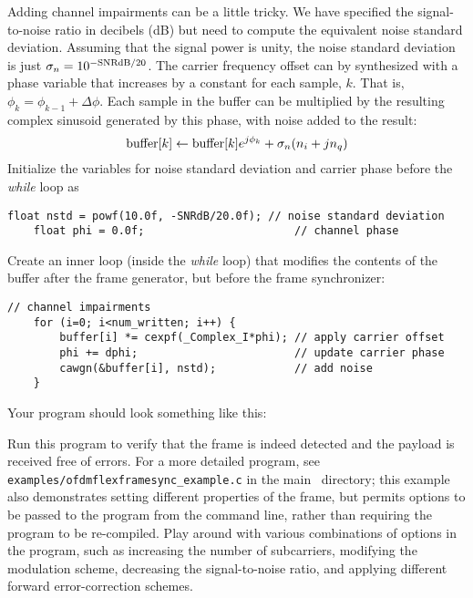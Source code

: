 Adding channel impairments can be a little tricky.
We have specified the signal-to-noise ratio in decibels (dB) but need to
compute the equivalent noise standard deviation.
Assuming that the signal power is unity, the noise standard deviation is
just $\sigma_n = 10^{-\textup{SNRdB}/20}$.
%
The carrier frequency offset can by synthesized with a phase variable
that increases by a constant for each sample, $k$.
That is, $\phi_{k} = \phi_{k-1} + \Delta\phi$.
Each sample in the buffer can be multiplied by the resulting complex
sinusoid generated by this phase, with noise added to the result:
\[
    \textup{buffer}[k] \leftarrow \textup{buffer}[k] e^{j\phi_{k}} + \sigma_n(n_i + jn_q)
\]
Initialize the variables for noise standard deviation and carrier phase
before the {\em while} loop as
%
\begin{Verbatim}[fontsize=\small]
    float nstd = powf(10.0f, -SNRdB/20.0f); // noise standard deviation
    float phi = 0.0f;                       // channel phase
\end{Verbatim}
%
Create an inner loop (inside the {\em while} loop) that modifies the
contents of the buffer after the frame generator, but before the frame
synchronizer:
%
\begin{Verbatim}[fontsize=\small]
    // channel impairments
    for (i=0; i<num_written; i++) {
        buffer[i] *= cexpf(_Complex_I*phi); // apply carrier offset
        phi += dphi;                        // update carrier phase
        cawgn(&buffer[i], nstd);            // add noise
    }
\end{Verbatim}
%
Your program should look something like this:
%

%
Run this program to verify that the frame is indeed detected
and the payload is received free of errors.
For a more detailed program, see
{\tt examples/ofdmflexframesync\_example.c}
in the main \liquid\ directory;
this example also demonstrates setting different properties of the
frame, but permits options to be passed to the program from the command
line, rather than requiring the program to be re-compiled.
%
Play around with various combinations of options in the program, such as
increasing the number of subcarriers,
modifying the modulation scheme, decreasing the signal-to-noise ratio,
and applying different forward error-correction schemes.

